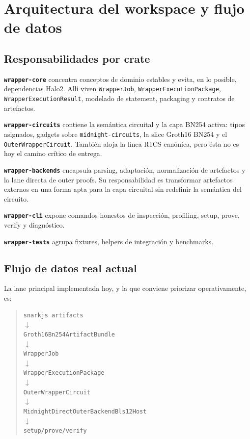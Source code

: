 \documentclass[11pt,a4paper]{article}
\begin{document}
\section{Arquitectura del workspace y flujo de datos}

\subsection{Responsabilidades por crate}

\textbf{\texttt{wrapper-core}} concentra conceptos de dominio estables y evita, en lo posible,
dependencias Halo2. All\'i viven \texttt{WrapperJob}, \texttt{WrapperExecutionPackage},
\texttt{WrapperExecutionResult}, modelado de statement, packaging y contratos de artefactos.

\textbf{\texttt{wrapper-circuits}} contiene la sem\'antica circuital y la capa BN254 activa:
tipos asignados, gadgets sobre \texttt{midnight-circuits}, la slice Groth16 BN254 y el
\texttt{OuterWrapperCircuit}. Tambi\'en aloja la l\'inea R1CS can\'onica, pero \'esta no es hoy
el camino cr\'itico de entrega.

\textbf{\texttt{wrapper-backends}} encapsula parsing, adaptaci\'on, normalizaci\'on de artefactos y
la lane directa de outer proofs. Su responsabilidad es transformar artefactos externos
en una forma apta para la capa circuital sin redefinir la sem\'antica del circuito.

\textbf{\texttt{wrapper-cli}} expone comandos honestos de inspecci\'on, profiling, setup, prove,
verify y diagn\'ostico.

\textbf{\texttt{wrapper-tests}} agrupa fixtures, helpers de integraci\'on y benchmarks.

\subsection{Flujo de datos real actual}

La lane principal implementada hoy, y la que conviene priorizar operativamente, es:

\begin{quote}
\texttt{snarkjs artifacts}\\
\(\downarrow\)\\
\texttt{Groth16Bn254ArtifactBundle}\\
\(\downarrow\)\\
\texttt{WrapperJob}\\
\(\downarrow\)\\
\texttt{WrapperExecutionPackage}\\
\(\downarrow\)\\
\texttt{OuterWrapperCircuit}\\
\(\downarrow\)\\
\texttt{MidnightDirectOuterBackendBls12Host}\\
\(\downarrow\)\\
\texttt{setup/prove/verify}
\end{quote}
\end{document}

